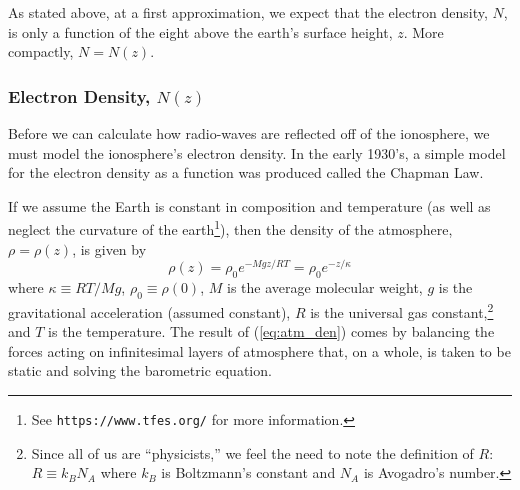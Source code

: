 \documentclass[11pt]{article}
\numberwithin{equation}{section}
\begin{document}
As stated above, at a first approximation, we expect that the electron density, $N$, is only a function of the eight above the earth's surface height, $z$. More compactly, $N = N(z)$. 

    \subsubsection{Electron Density, $N(z)$} %
    \label{ssub:electron_density}
    Before we can calculate how radio-waves are reflected off of the ionosphere, we must model the ionosphere's electron density. In the early 1930's, a simple model for the electron density as a function was produced called the Chapman Law.\cite{chapman1931b,chapman1931a} 

    If we assume the Earth is constant in composition and temperature (as well as neglect the curvature of the earth\footnote{See \texttt{https://www.tfes.org/} for more information.}), then the density of the atmosphere, $\rho = \rho(z)$, is given by 
    \begin{equation}
        \rho(z) = \rho_0 e^{-M g z/ RT} = \rho_0 e^{- z/\kappa} 
        \label{eq:atm_den}
    \end{equation} where $ \kappa \equiv RT/Mg$, $\rho_0 \equiv \rho(0)$, $M$ is the average molecular weight, $g$ is the gravitational acceleration (assumed constant), $R$ is the universal gas constant,\footnote{Since all of us are ``physicists,'' we feel the need to note the definition of $R$: $R\equiv k_B N_A$ where $k_B$ is Boltzmann's constant and $N_A$ is Avogadro's number.} and $T$ is the temperature. The result of (\ref{eq:atm_den}) comes by balancing the forces acting on infinitesimal layers of atmosphere that, on a whole, is taken to be static and solving the barometric equation.\cite{schroeder1999introduction}
    
\end{document}
